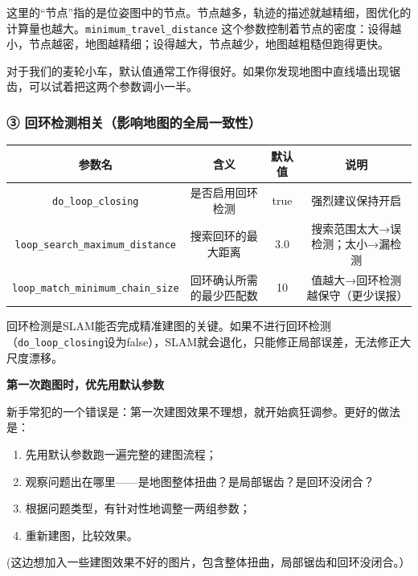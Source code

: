 \documentclass[UTF8,zihao=-4]{ctexart}
\DeclareRobustCommand{\code}[1]{\texttt{#1}}
\begin{document}
这里的“节点”指的是位姿图中的节点。节点越多，轨迹的描述就越精细，图优化的计算量也越大。\code{minimum\_travel\_distance} 这个参数控制着节点的密度：设得越小，节点越密，地图越精细；设得越大，节点越少，地图越粗糙但跑得更快。

对于我们的麦轮小车，默认值通常工作得很好。如果你发现地图中直线墙出现锯齿，可以试着把这两个参数调小一半。

\subsubsection*{③ 回环检测相关（影响地图的全局一致性）}

\begin{table}[h]
\centering
\begin{tabular}{|c|c|c|c|}
\hline
\textbf{参数名} & \textbf{含义} & \textbf{默认值} & \textbf{说明} \\
\hline
\code{do\_loop\_closing} & 是否启用回环检测 & true & 强烈建议保持开启 \\
\hline
\code{loop\_search\_maximum\_distance} & 搜索回环的最大距离 & 3.0 & 搜索范围太大→误检测；太小→漏检测 \\
\hline
\code{loop\_match\_minimum\_chain\_size} & 回环确认所需的最少匹配数 & 10 & 值越大→回环检测越保守（更少误报） \\
\hline
\end{tabular}
\end{table}

回环检测是SLAM能否完成精准建图的关键。如果不进行回环检测（\code{do\_loop\_closing}设为false），SLAM就会退化，只能修正局部误差，无法修正大尺度漂移。

\begin{center}
\end{center}

\textbf{第一次跑图时，优先用默认参数}

新手常犯的一个错误是：第一次建图效果不理想，就开始疯狂调参。更好的做法是：

\begin{enumerate}
\item 先用默认参数跑一遍完整的建图流程；
\item 观察问题出在哪里——是地图整体扭曲？是局部锯齿？是回环没闭合？
\item 根据问题类型，有针对性地调整一两组参数；
\item 重新建图，比较效果。
\end{enumerate}
(这边想加入一些建图效果不好的图片，包含整体扭曲，局部锯齿和回环没闭合。）
\end{document}
